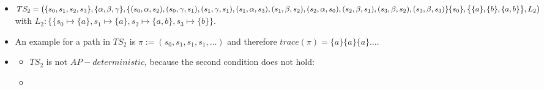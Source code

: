\documentclass[a4paper,11pt]{scrartcl}
\begin{document}
\begin{itemize}
\begin{itemize}
			\item[(ii)] $TS_1$ is also $action-deterministic$, because both conditions hold:
			\begin{itemize}
				\item $\mid I \mid = \mid \{s_0\} \leq 1$
				\item $|Post(s_0, \alpha)| = |Post(s_0, \gamma)| = |Post(s_1, \alpha)| = |Post(s_1, \beta)|= |Post(s_1, \gamma)|= |Post(s_2, \alpha)| = |Post(s_2, \beta)| = |Post(s_4, \alpha)|= |Post(s_4, \gamma)| = 1$ and for every other pair $(s_i, \sigma)$ with $s_i \in \{s_0, s_1, s_2, s_3, s_4\}$ and $\sigma \in \{\alpha, \beta, \gamma\}$ holds $(s_i, \sigma)=0$.
			\end{itemize}
		\end{itemize}
		\item[d)] $ TS_2 = \bigl( \{s_0, s_1, s_2, s_3\}, \{\alpha,\beta, \gamma\}, \\
		\{ (s_0, \alpha, s_2), (s_0, \gamma, s_1), (s_1, \gamma, s_1), (s_1, \alpha, s_3), (s_1, \beta, s_2), (s_2, \alpha, s_0), (s_2, \beta, s_1), (s_3, \beta, s_2), (s_3, \beta, s_3) \}\\
		\{s_0\}, \bigl\{ \{a\}, \{b\}, \{a,b\} \bigr\}, L_2 \bigr)$\\
		with $L_2: \bigl\{ \{s_0 \mapsto \{a\}, s_1 \mapsto \{a\}, s_2 \mapsto \{a,b\}, s_3 \mapsto \{b\}\bigr\}$.
		\item[e)] An example for a path in $TS_2$ is $\pi := (s_0, s_1, s_1, s_1, \dots)$ and therefore $trace(\pi)=\{a\}\{a\}\{a\}\dots$.
		\item[f)]
		\begin{itemize}
			\item[(i)] $TS_2$ is not $AP-deterministic$, because the second condition does not hold: 
			\item[(ii)] 
		\end{itemize}
	\end{itemize}
	
\end{document}
